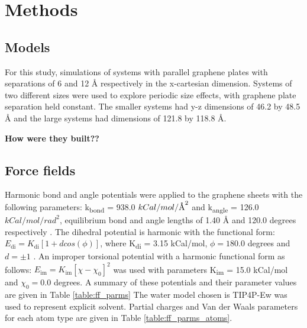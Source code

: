 \documentclass[12pt]{article}
\newcommand{\angstrom}{\textup{\AA}}
\begin{document}
\clearpage

\section*{Methods}

\subsection*{Models}

For this study, simulations of systems with parallel graphene plates with
separations of 6 and 12 \r A respectively in the x-cartesian dimension.
Systems of two different sizes were used to explore periodic size effects, with graphene
plate separation held constant. The smaller systems had y-z dimensions of 46.2 by 48.5 \r A
and the large systems had dimensions of 121.8 by 118.8 \r A.

\textbf{\color{red} How were they built?? }

\subsection*{Force fields}

Harmonic bond and angle potentials were applied to the graphene sheets with 
the following parameters: k\textsubscript{bond} = 938.0 \(kCal/mol/\angstrom^2\)
and k\textsubscript{angle} = 126.0 \(kCal/mol/rad^2\), equilibrium bond and 
angle lengths of 1.40 \r A and 120.0 degrees respectively \cite{Hummer2001}. The
dihedral potential is harmonic with the functional form: \(E_{\text{di}} = K_{\text{di}} [ 1 + d cos(\phi)]\),
where K\textsubscript{di} = 3.15 kCal/mol, \(\phi = 180.0\) degrees and \(d = \pm 1\) \cite{Patra2009}. An improper torsional 
potential with a harmonic functional form as follows: \( E_{\text{im}} = K_{\text{im}} [ \chi - \chi_0 ]^2\) was
used with parameters K\textsubscript{im} =  15.0 kCal/mol and \(\chi_0 = 0.0\) degrees. A summary
of these potentials and their parameter values are given in Table \ref{table:ff_parms}
The water model chosen is TIP4P-Ew \cite{Horn2004} was used 
to represent explicit solvent. Partial charges and Van der Waals parameters for each atom type 
are given in Table \ref{table:ff_parms_atoms}.
\end{document}
